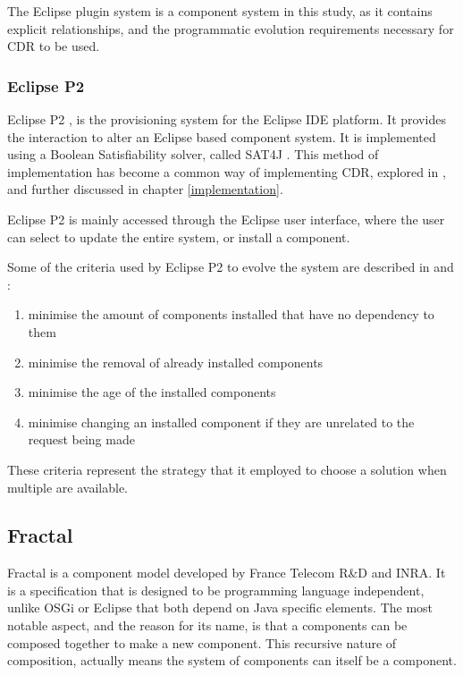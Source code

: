 The Eclipse plugin system is a component system in this study, 
as it contains explicit relationships, and the programmatic evolution requirements necessary for CDR to be used.

\subsubsection{Eclipse P2}
Eclipse P2 \citep{le_berre_dependency_2009}, \citep{leBerre2010} is the provisioning system for the Eclipse IDE platform.
It provides the interaction to alter an Eclipse based component system. 
It is implemented using a Boolean Satisfiability solver, called SAT4J \citep{le2010sat4j}.
This method of implementation has become a common way of implementing CDR, explored in \citep{Berre2008}, and further discussed in chapter \ref{implementation}.

Eclipse P2 is mainly accessed through the Eclipse user interface, where the user can select to update the entire system, or install a component.

Some of the criteria used by Eclipse P2 to evolve the system are described in \citep{le_berre_dependency_2009} and \citep{leBerre2010}:
\begin{enumerate}
  \item minimise the amount of components installed that have no dependency to them 
  \item minimise the removal of already installed components
  \item minimise the age of the installed components
  \item minimise changing an installed component if they are unrelated to the request being made
\end{enumerate} 

These criteria represent the strategy that it employed to choose a solution when multiple are available. 

\subsection{Fractal}
Fractal \citep{Quma2006} is a component model developed by France Telecom R\&D and INRA.
It is a specification that is designed to be programming language independent, unlike OSGi or Eclipse that both depend on Java specific elements.
The most notable aspect, and the reason for its name, is that a components can be composed together to make a new component.
This recursive nature of composition, actually means the system of components can itself be a component.

